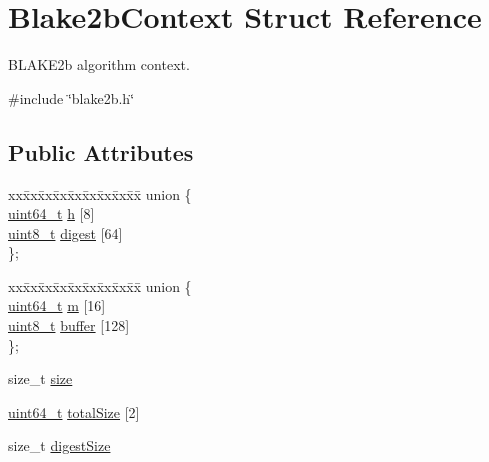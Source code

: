 \hypertarget{structBlake2bContext}{}\section{Blake2b\+Context Struct Reference}
\label{structBlake2bContext}


B\+L\+A\+K\+E2b algorithm context.  




{\ttfamily \#include \char`\"{}blake2b.\+h\char`\"{}}

\subsection*{Public Attributes}
\begin{DoxyCompactItemize}
\item 
\begin{tabbing}
xx\=xx\=xx\=xx\=xx\=xx\=xx\=xx\=xx\=\kill
union \{\\
\>\hyperlink{stdint_8h_aec6fcb673ff035718c238c8c9d544c47}{uint64\_t} \hyperlink{structBlake2bContext_af58742ce97114c25ec5062b180c1d344}{h} \mbox{[}8\mbox{]}\\
\>\hyperlink{stdint_8h_aba7bc1797add20fe3efdf37ced1182c5}{uint8\_t} \hyperlink{structBlake2bContext_a52c4b94d32c916bd5b9a0cfac711f46a}{digest} \mbox{[}64\mbox{]}\\
\}; \\

\end{tabbing}\item 
\begin{tabbing}
xx\=xx\=xx\=xx\=xx\=xx\=xx\=xx\=xx\=\kill
union \{\\
\>\hyperlink{stdint_8h_aec6fcb673ff035718c238c8c9d544c47}{uint64\_t} \hyperlink{structBlake2bContext_a1c5c35e976cc71762722092c34cdf09f}{m} \mbox{[}16\mbox{]}\\
\>\hyperlink{stdint_8h_aba7bc1797add20fe3efdf37ced1182c5}{uint8\_t} \hyperlink{structBlake2bContext_a4c6fd944f37989469757f2b83dc1fbd1}{buffer} \mbox{[}128\mbox{]}\\
\}; \\

\end{tabbing}\item 
size\+\_\+t \hyperlink{structBlake2bContext_a67cdba5ee54f03a5c0a779a2547781e4}{size}
\item 
\hyperlink{stdint_8h_aec6fcb673ff035718c238c8c9d544c47}{uint64\+\_\+t} \hyperlink{structBlake2bContext_ad9830491b846cc33a13f9c0f1c511647}{total\+Size} \mbox{[}2\mbox{]}
\item 
size\+\_\+t \hyperlink{structBlake2bContext_a90c528ad18d05f458cf5f57f029973fa}{digest\+Size}
\end{DoxyCompactItemize}


